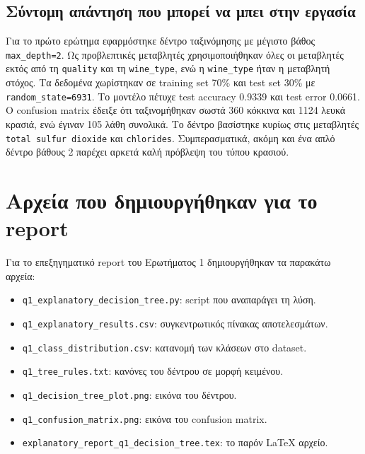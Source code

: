 \documentclass[12pt,a4paper]{article}
\newcommand{\code}[1]{\texttt{\textenglish{#1}}}
\begin{document}
\subsection{Σύντομη απάντηση που μπορεί να μπει στην εργασία}

Για το πρώτο ερώτημα εφαρμόστηκε δέντρο ταξινόμησης με μέγιστο βάθος
\code{max\_depth=2}. Ως προβλεπτικές μεταβλητές χρησιμοποιήθηκαν όλες οι
μεταβλητές εκτός από τη \code{quality} και τη \code{wine\_type}, ενώ η
\code{wine\_type} ήταν η μεταβλητή στόχος. Τα δεδομένα χωρίστηκαν σε training
set 70\% και test set 30\% με \code{random\_state=6931}. Το μοντέλο πέτυχε
test accuracy 0.9339 και test error 0.0661. Ο confusion matrix έδειξε ότι
ταξινομήθηκαν σωστά 360 κόκκινα και 1124 λευκά κρασιά, ενώ έγιναν 105 λάθη
συνολικά. Το δέντρο βασίστηκε κυρίως στις μεταβλητές \code{total sulfur dioxide}
και \code{chlorides}. Συμπερασματικά, ακόμη και ένα απλό δέντρο βάθους 2
παρέχει αρκετά καλή πρόβλεψη του τύπου κρασιού.

\appendix
\section{Αρχεία που δημιουργήθηκαν για το report}

Για το επεξηγηματικό report του Ερωτήματος 1 δημιουργήθηκαν τα παρακάτω
αρχεία:

\begin{itemize}
    \item \code{q1\_explanatory\_decision\_tree.py}: script που αναπαράγει τη
    λύση.
    \item \code{q1\_explanatory\_results.csv}: συγκεντρωτικός πίνακας
    αποτελεσμάτων.
    \item \code{q1\_class\_distribution.csv}: κατανομή των κλάσεων στο dataset.
    \item \code{q1\_tree\_rules.txt}: κανόνες του δέντρου σε μορφή κειμένου.
    \item \code{q1\_decision\_tree\_plot.png}: εικόνα του δέντρου.
    \item \code{q1\_confusion\_matrix.png}: εικόνα του confusion matrix.
    \item \code{explanatory\_report\_q1\_decision\_tree.tex}: το παρόν
    LaTeX αρχείο.
\end{itemize}
\end{document}

